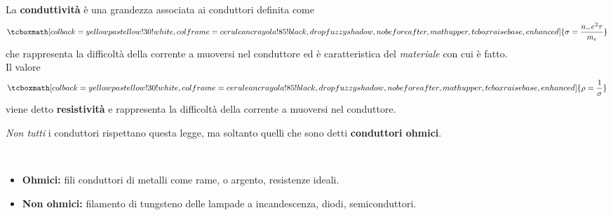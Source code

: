 \begin{define}
	La \textbf{conduttività} è una grandezza associata ai conduttori definita come
	\begin{equation}
		\tcboxmath[colback=yellowpastellow!30!white,colframe=ceruleancrayola!85!black,drop fuzzy shadow, nobeforeafter, math upper, tcbox raise base, enhanced]{\sigma=\frac{n_{-}e^2\tau}{m_{e}}}
	\end{equation}
	che rappresenta la difficoltà della corrente a muoversi nel conduttore ed è caratteristica del \textit{materiale} con cui è fatto.\\
	Il valore
	\begin{equation}
		\tcboxmath[colback=yellowpastellow!30!white,colframe=ceruleancrayola!85!black,drop fuzzy shadow, nobeforeafter, math upper, tcbox raise base, enhanced]{\rho=\frac{1}{\sigma}}
	\end{equation}
	viene detto \textbf{resistività} e rappresenta la difficoltà della corrente a muoversi nel conduttore.
\end{define}
\textit{Non tutti} i conduttori rispettano questa legge, ma soltanto quelli che sono detti \textbf{conduttori ohmici}.
\begin{exampleswt}~
	\begin{itemize}
		\item \textbf{Ohmici:} fili conduttori di metalli come rame, o argento, resistenze ideali.
		\item \textbf{Non ohmici:} filamento di tungsteno delle lampade a incandescenza, diodi, semiconduttori.
	\end{itemize}
\end{exampleswt}
